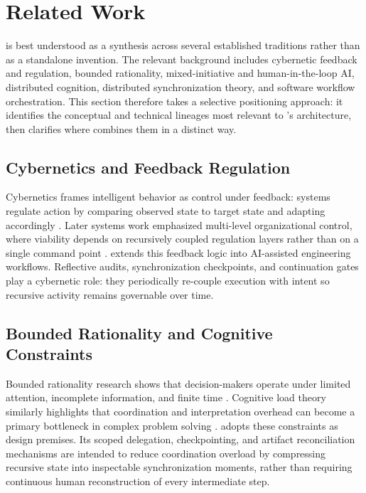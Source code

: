 \section{Related Work}
\label{sec:related-work}

 is best understood as a synthesis across several established traditions rather than as a standalone invention. The relevant background includes cybernetic feedback and regulation, bounded rationality, mixed-initiative and human-in-the-loop AI, distributed cognition, distributed synchronization theory, and software workflow orchestration. This section therefore takes a selective positioning approach: it identifies the conceptual and technical lineages most relevant to 's architecture, then clarifies where  combines them in a distinct way.

\subsection{Cybernetics and Feedback Regulation}

Cybernetics frames intelligent behavior as control under feedback: systems regulate action by comparing observed state to target state and adapting accordingly \cite{Wiener1948Cybernetics}. Later systems work emphasized multi-level organizational control, where viability depends on recursively coupled regulation layers rather than on a single command point \cite{Beer1972BrainFirm}.  extends this feedback logic into AI-assisted engineering workflows. Reflective audits, synchronization checkpoints, and continuation gates play a cybernetic role: they periodically re-couple execution with intent so recursive activity remains governable over time.

\subsection{Bounded Rationality and Cognitive Constraints}

Bounded rationality research shows that decision-makers operate under limited attention, incomplete information, and finite time \cite{Simon1957ModelsMan}. Cognitive load theory similarly highlights that coordination and interpretation overhead can become a primary bottleneck in complex problem solving \cite{Sweller1988CognitiveLoad}.  adopts these constraints as design premises. Its scoped delegation, checkpointing, and artifact reconciliation mechanisms are intended to reduce coordination overload by compressing recursive state into inspectable synchronization moments, rather than requiring continuous human reconstruction of every intermediate step.

